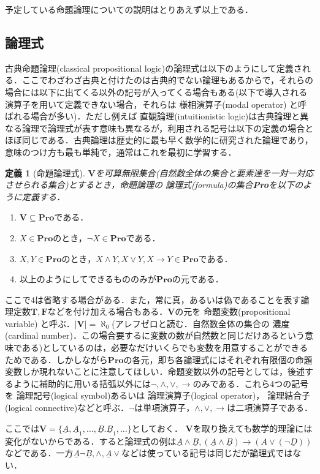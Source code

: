 \documentclass{ltjsarticle}
\theoremstyle{mystyle1}
\newtheorem{dfn}{定義}[section]
\theoremstyle{mystyle3}
\theoremstyle{mystyle2}
\newcommand{\uA}{\underline{A}}
\newcommand{\uB}{\underline{B}}
\newcommand{\uD}{\underline{D}}
\newcommand{\bT}{\ensuremath{\mathbf{T}}}
\newcommand{\bF}{\ensuremath{\mathbf{F}}}
\newcommand{\bV}{\ensuremath{\mathbf{V}}}
\newcommand{\bPro}{\ensuremath{\mathbf{Pro}}}
\newcommand{\red}[1]{{\color{red} #1}}
\begin{document}
予定している命題論理についての説明はとりあえず以上である．
\subsection{論理式}
古典命題論理(classical propositional logic)の論理式は以下のようにして定義される．ここでわざわざ古典と付けたのは古典的でない論理もあるからで，それらの場合には以下に出てくる以外の記号が入ってくる場合もある(以下で導入される演算子を用いて定義できない場合，それらは\red{様相演算子}(modal operator) と呼ばれる場合が多い)．ただし例えば\red{直観論理}(intuitionistic logic)は古典論理と異なる論理で論理式が表す意味も異なるが，利用される記号は以下の定義の場合とほぼ同じである．古典論理は歴史的に最も早く数学的に研究された論理であり，意味のつけ方も最も単純で，通常はこれを最初に学習する．
\begin{dfn}[命題論理式]
$\bV$を可算無限集合(自然数全体の集合と要素達を一対一対応させられる集合)とするとき，命題論理の\red{論理式}(formula)の集合\textbf{Pro}を以下のように定義する．
\end{dfn}
\begin{enumerate}
  \item $\bV\subseteq\bPro$である．
  \item $X\in\bPro$のとき，$\neg X\in\bPro$である．
  \item $X,Y\in\bPro$のとき，$X\wedge Y,X\vee Y,X\to Y\in\bPro$である．
  \item 以上のようにしてできるもののみが$\bPro$の元である．
\end{enumerate}
ここで4は省略する場合がある．また，常に真，あるいは偽であることを表す論理定数$\bT,\bF$などを付け加える場合もある．$\bV$の元を\red{命題変数}(propositional variable) と呼ぶ．$|\bV|= \aleph_0$(アレフゼロと読む．自然数全体の集合の\red{濃度}(cardinal number)．この場合要するに変数の数が自然数と同じだけあるという意味である)としているのは，必要なだけいくらでも変数を用意することができるためである．しかしながら$\bPro$の各元，即ち各論理式にはそれぞれ有限個の命題変数しか現れないことに注意してほしい．命題変数以外の記号としては，後述するように補助的に用いる括弧以外には$\neg,\wedge,\vee,\to$のみである．これら4つの記号を\red{論理記号}(logical symbol)あるいは\red{論理演算子}(logical operator)，\red{論理結合子}(logical connective)などと呼ぶ．$\neg$は単項演算子，$\wedge,\vee,\to$は二項演算子である．

ここでは$\bV = \{\uA, \uA_1, \ldots, \uB. \uB_1, \ldots\}$としておく． $\bV$を取り換えても数学的理論には変化がないからである．すると論理式の例は$\uA\wedge\uB, \left(\uA\wedge\uB\right) \to \left(A\vee\left(\neg \uD\right)\right)$などである．一方$\uA\neg\uB, \wedge, \uA\vee$などは使っている記号は同じだが論理式ではない．
\end{document}
